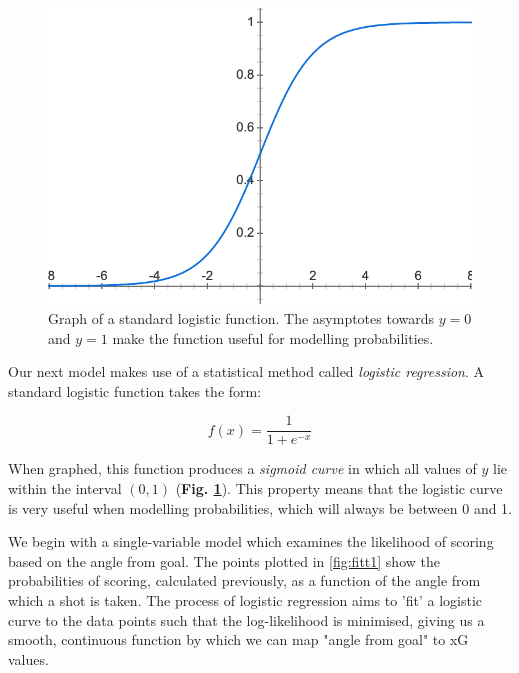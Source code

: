 \documentclass{l4proj}
\begin{document}
\begin{figure}[h]
    \centering
    \includegraphics[scale=0.6]{images/logistic.png}   
    \caption{Graph of a standard logistic function. The asymptotes towards $y=0$ and $y=1$ make the function useful for modelling probabilities.}
    \label{fig:logcurv} 
\end{figure}

Our next model makes use of a statistical method called \textit{logistic regression}. A standard logistic function takes the form:

\[ f(x) = \frac{1}{1 + e^{-x}} \]

When graphed, this function produces a \textit{sigmoid curve} in which all values of $y$ lie within the interval $(0,1)$ (\textbf{Fig. \ref{fig:logcurv}}). This property means that the logistic curve is very useful when modelling probabilities, which will always be between 0 and 1. 

We begin with a single-variable model which examines the likelihood of scoring based on the angle from goal. The points plotted in \ref{fig:fitt1} show the probabilities of scoring, calculated previously, as a function of the angle from which a shot is taken. The process of logistic regression aims to 'fit' a logistic curve to the data points such that the log-likelihood is minimised, giving us a smooth, continuous function by which we can map "angle from goal" to xG values.
\end{document}
